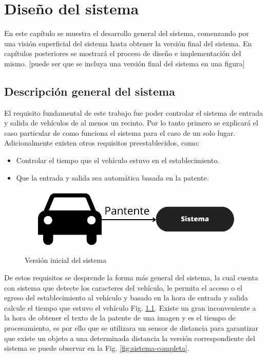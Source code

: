 \chapter{Diseño del sistema}

En este capítulo se muestra el desarrollo general del sistema, comenzando por una visión superficial del sistema hasta obtener la versión final del sistema. En capítulos posteriores se mostrará el proceso de diseño e implementación del mismo. [puede ser que se incluya una versión final del sistema en una figura]

\section{Descripción general del sistema}

El requisito fundamental de este trabajo fue poder controlar el sistema de entrada y salida de vehículos de al menos un recinto. Por lo tanto primero se explicará el caso particular de como funciona el sistema para el caso de un solo lugar. Adicionalmente existen otros requisitos preestablecidos, como:

\begin{itemize}
    \item Controlar el tiempo que el vehículo estuvo en el establecimiento.
    \item Que la entrada y salida sea automática basada en la patente.
\end{itemize}

\begin{figure}
    \centering
    \includegraphics[width=.8\textwidth]{imgs/sistema-base.png}
    \caption{Versión inicial del sistema}
    \label{fig:sistema-base}
\end{figure}

De estos requisitos se desprende la forma más general del sistema, la cual cuenta con sistema que detecte los caracteres del vehículo, le permita el acceso o el egreso del establecimiento al vehículo y basado en la hora de entrada y salida calcule el tiempo que estuvo el vehículo Fig. \ref{fig:sistema-base}. Existe un gran inconveniente a la hora de obtener el texto de la patente de una imagen y es el tiempo de procesamiento, es por ello que se utilizara un sensor de distancia para garantizar que existe un objeto a una determinada distancia la versión correspondiente del sistema se puede observar en la Fig. \ref{fig:sistema-completa}.

